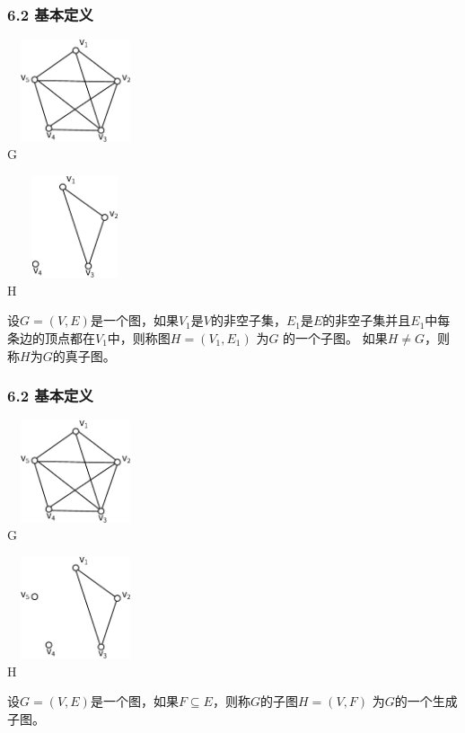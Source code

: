 \documentclass{beamer}
\begin{document}
\begin{CJK}{UTF8}{gbsn}
\begin{frame}
  \frametitle{6.2 基本定义}
    \begin{minipage}[c]{0.4\textwidth}
\includegraphics[width=4cm,height=3cm]{subgraph1} \\ \centering G 
    \end{minipage}\hspace{2cm}
    \begin{minipage}[c]{0.4\textwidth}
\includegraphics[width=4cm,height=3cm]{subgraph2} \\ \centering H 
    \end{minipage}
    \pause
  \begin{definition6.2.6}
    设$G=(V,E)$是一个图，如果$V_1$是$V$的非空子集，$E_1$是$E$的非空子集并且$E_1$中每条边的顶点都在$V_1$中，则称图$H=(V_1,E_1)$ 为$G$ 的一个\alert{子图}。
如果$H \neq G$，则称$H$为$G$的\alert{真子图}。
  \end{definition6.2.6}
\end{frame}

\begin{frame}
  \frametitle{6.2 基本定义}
    \begin{minipage}[c]{0.4\textwidth}
\includegraphics[width=4cm,height=3cm]{subgraph1} \\ \centering G 
    \end{minipage}\hspace{2cm}
    \begin{minipage}[c]{0.4\textwidth}
\includegraphics[width=4cm,height=3cm]{spanning} \\ \centering H 
    \end{minipage}
    \pause
  \begin{definition6.2.7}
    设$G=(V,E)$是一个图，如果$F\subseteq E$，则称$G$的子图$H=(V,F)$ 为$G$的一个\alert{生成子图}。
  \end{definition6.2.7}
\end{frame}


\end{CJK}
\end{document}
